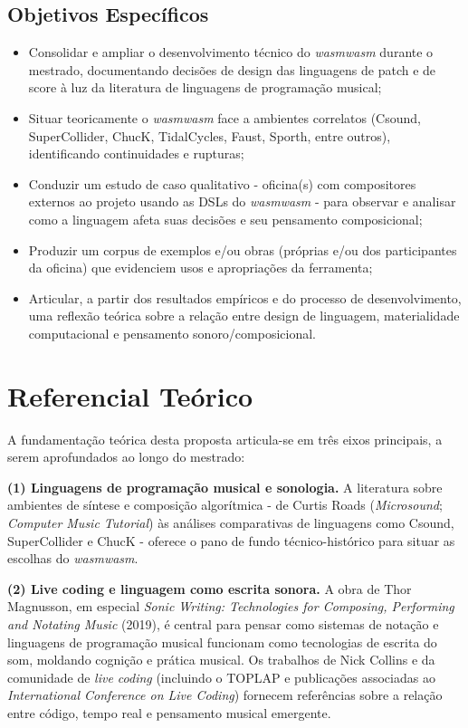 \documentclass[12pt,a4paper]{article}
\begin{document}
\subsection{Objetivos Específicos}

\begin{itemize}
  \item Consolidar e ampliar o desenvolvimento técnico do \emph{wasmwasm} durante o mestrado, documentando decisões de design das linguagens de patch e de score à luz da literatura de linguagens de programação musical;
  \item Situar teoricamente o \emph{wasmwasm} face a ambientes correlatos (Csound, SuperCollider, ChucK, TidalCycles, Faust, Sporth, entre outros), identificando continuidades e rupturas;
  \item Conduzir um estudo de caso qualitativo - oficina(s) com compositores externos ao projeto usando as DSLs do \emph{wasmwasm} - para observar e analisar como a linguagem afeta suas decisões e seu pensamento composicional;
  \item Produzir um corpus de exemplos e/ou obras (próprias e/ou dos participantes da oficina) que evidenciem usos e apropriações da ferramenta;
  \item Articular, a partir dos resultados empíricos e do processo de desenvolvimento, uma reflexão teórica sobre a relação entre design de linguagem, materialidade computacional e pensamento sonoro/composicional.
\end{itemize}

\section{Referencial Teórico}

A fundamentação teórica desta proposta articula-se em três eixos principais, a serem aprofundados ao longo do mestrado:

\textbf{(1) Linguagens de programação musical e sonologia.} A literatura sobre ambientes de síntese e composição algorítmica - de Curtis Roads (\emph{Microsound}; \emph{Computer Music Tutorial}) às análises comparativas de linguagens como Csound, SuperCollider e ChucK - oferece o pano de fundo técnico-histórico para situar as escolhas do \emph{wasmwasm}.

\textbf{(2) Live coding e linguagem como escrita sonora.} A obra de Thor Magnusson, em especial \emph{Sonic Writing: Technologies for Composing, Performing and Notating Music} (2019), é central para pensar como sistemas de notação e linguagens de programação musical funcionam como tecnologias de escrita do som, moldando cognição e prática musical. Os trabalhos de Nick Collins e da comunidade de \emph{live coding} (incluindo o TOPLAP e publicações associadas ao \emph{International Conference on Live Coding}) fornecem referências sobre a relação entre código, tempo real e pensamento musical emergente.
\end{document}
